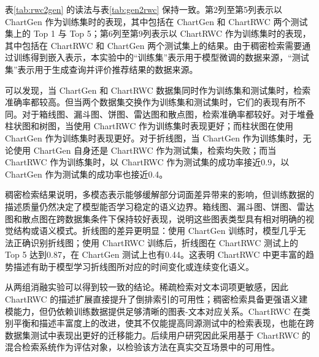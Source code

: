 表\ref{tab:rwc2gen} 的读法与表\ref{tab:gen2rwc} 保持一致。第2列至第5列表示以 ChartGen 作为训练集时的表现，其中包括在 ChartGen 和 ChartRWC 两个测试集上的 Top 1 与 Top 5；第6列至第9列表示以 ChartRWC 作为训练集时的表现，其中包括在 ChartRWC 和 ChartGen 两个测试集上的结果。由于稠密检索需要通过训练得到嵌入表示，本实验中的“训练集”表示用于模型微调的数据来源，“测试集”表示用于生成查询并评价推荐结果的数据来源。

可以发现，当 ChartGen 和 ChartRWC 数据集同时作为训练集和测试集时，检索准确率都较高。但当两个数据集交换作为训练集和测试集时，它们的表现有所不同。对于箱线图、漏斗图、饼图、雷达图和散点图，检索准确率都较好。对于堆叠柱状图和树图，当使用 ChartRWC 作为训练集时表现更好；而柱状图在使用 ChartGen 作为训练集时表现更好。对于折线图，当 ChartGen 作为训练集时，无论使用 ChartGen 自身还是 ChartRWC 作为测试集，检索均失败；而当 ChartRWC 作为训练集时，以 ChartRWC 作为测试集的成功率接近0.9，以 ChartGen 作为测试集的成功率也接近0.4。

稠密检索结果说明，多模态表示能够缓解部分词面差异带来的影响，但训练数据的描述质量仍然决定了模型能否学习稳定的语义边界。箱线图、漏斗图、饼图、雷达图和散点图在跨数据集条件下保持较好表现，说明这些图表类型具有相对明确的视觉结构或语义模式。折线图的差异更明显：使用 ChartGen 训练时，模型几乎无法正确识别折线图；使用 ChartRWC 训练后，折线图在 ChartRWC 测试上的 Top 5 达到0.87，在 ChartGen 测试上也有0.44。这表明 ChartRWC 中更丰富的趋势描述有助于模型学习折线图所对应的时间变化或连续变化语义。

从两组消融实验可以得到较一致的结论。稀疏检索对文本词项更敏感，因此 ChartRWC 的描述扩展直接提升了倒排索引的可用性；稠密检索具备更强语义建模能力，但仍依赖训练数据提供足够清晰的图表-文本对应关系。ChartRWC 在类别平衡和描述丰富度上的改进，使其不仅能提高同源测试中的检索表现，也能在跨数据集测试中表现出更好的迁移能力。后续用户研究因此采用基于 ChartRWC 的混合检索系统作为评估对象，以检验该方法在真实交互场景中的可用性。

